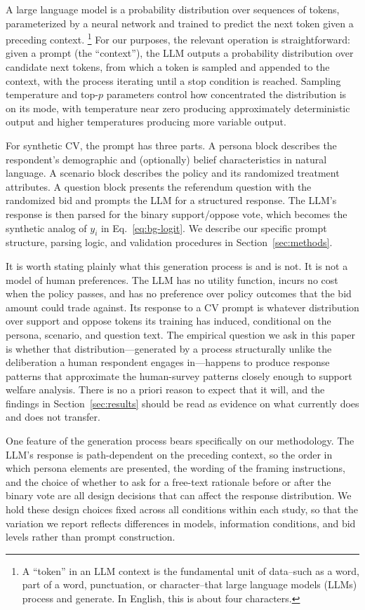 \documentclass[12pt]{article}
\begin{document}
A large language model is a probability distribution over sequences of
tokens, parameterized by a neural network and trained to predict the next
token given a preceding context.
\footnote{A ``token'' in an LLM context is the fundamental unit of data--such as a word, part of a word, punctuation, or character--that large language models (LLMs) process and generate. In English, this is about four characters.} 
For our purposes, the relevant operation
is straightforward: given a prompt (the ``context''), the LLM outputs a
probability distribution over candidate next tokens, from which a token
is sampled and appended to the context, with the process iterating until
a stop condition is reached. Sampling temperature and top-$p$ parameters
control how concentrated the distribution is on its mode, with temperature
near zero producing approximately deterministic output and higher
temperatures producing more variable output.

For synthetic CV, the prompt has three parts. A persona block describes
the respondent's demographic and (optionally) belief characteristics in
natural language. A scenario block describes the policy and its randomized
treatment attributes. A question block presents the referendum question
with the randomized bid and prompts the LLM for a structured response.
The LLM's response is then parsed for the binary support/oppose vote,
which becomes the synthetic analog of $y_i$ in
Eq.~\ref{eq:bg-logit}. We describe our specific prompt structure, parsing
logic, and validation procedures in Section~\ref{sec:methods}.

It is worth stating plainly what this generation process is and is not.
It is not a model of human preferences. The LLM has no utility function,
incurs no cost when the policy passes, and has no preference over policy
outcomes that the bid amount could trade against. Its response to a CV
prompt is whatever distribution over support and oppose tokens its
training has induced, conditional on the persona, scenario, and question
text. The empirical question we ask in this paper is whether that
distribution---generated by a process structurally unlike the
deliberation a human respondent engages in---happens to produce response
patterns that approximate the human-survey patterns closely enough to
support welfare analysis. There is no a priori reason to expect that it
will, and the findings in Section~\ref{sec:results} should be read as
evidence on what currently does and does not transfer.

One feature of the generation process bears specifically on our methodology. The LLM's response is path-dependent on the preceding context, so the order in which persona elements are presented, the wording of the framing instructions, and the choice of whether to ask for a free-text rationale before or after the binary vote are all design decisions that can affect the response distribution. We hold these design choices fixed across all conditions within each study, so that the variation we report reflects differences in models, information conditions, and bid levels rather than prompt construction.
\end{document}
